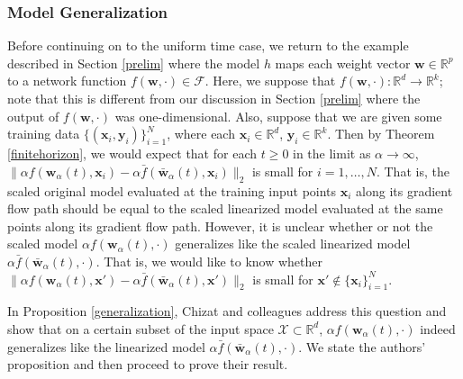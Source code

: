 \documentclass{article}
\begin{document}
\subsubsection{Model Generalization}
Before continuing on to the uniform time case, we return to the example described in Section \ref{prelim} where the model $h$ maps each weight vector $\boldsymbol{w} \in \mathbb{R}^p$ to a network function $f(\boldsymbol{w}, \cdot) \in \mathcal{F}$. Here, we suppose that $f(\boldsymbol{w}, \cdot): \mathbb{R}^d \rightarrow \mathbb{R}^k$; note that this is different from our discussion in Section \ref{prelim} where the output of $f(\boldsymbol{w}, \cdot)$ was one-dimensional. Also, suppose that we are given some training data $\{(\boldsymbol{x}_i, \boldsymbol{y}_i) \}_{i=1}^N$, where each $\boldsymbol{x}_i \in \mathbb{R}^d$, $\boldsymbol{y}_i \in \mathbb{R}^k$. Then by Theorem \ref{finitehorizon}, we would expect that for each $t \geq 0$ in the limit as $\alpha \rightarrow \infty$, $\| \alpha f(\boldsymbol{w}_{\alpha}(t), \boldsymbol{x}_i) -   \alpha  \bar{f}(\boldsymbol{\bar{w}}_{\alpha}(t), \boldsymbol{x}_i) \|_2$ is small for $i = 1, \ldots, N$. That is, the scaled original model evaluated at the training input points $\boldsymbol{x}_i$ along its gradient flow path should be equal to the scaled linearized model evaluated at the same points along its gradient flow path. However, it is unclear whether or not the scaled model $\alpha f(\boldsymbol{w}_{\alpha}(t), \cdot)$ generalizes like the scaled linearized model $\alpha \bar{f}(\boldsymbol{\bar{w}}_{\alpha}(t), \cdot)$. That is, we would like to know whether $\| \alpha f(\boldsymbol{w}_{\alpha}(t), \boldsymbol{x}') -   \alpha  \bar{f}(\boldsymbol{\bar{w}}_{\alpha}(t), \boldsymbol{x}') \|_2$ is small for $\boldsymbol{x}' \notin \{ \boldsymbol{x}_i \}_{i=1}^N$.

In Proposition \ref{generalization}, Chizat and colleagues address this question and show that on a certain subset of the input space $\mathcal{X} \subset \mathbb{R}^d$, $\alpha f(\boldsymbol{w}_{\alpha}(t), \cdot)$ indeed generalizes like the linearized model $\alpha \bar{f}(\boldsymbol{\bar{w}}_{\alpha}(t), \cdot)$. We state the authors' proposition and then proceed to prove their result.
\end{document}
